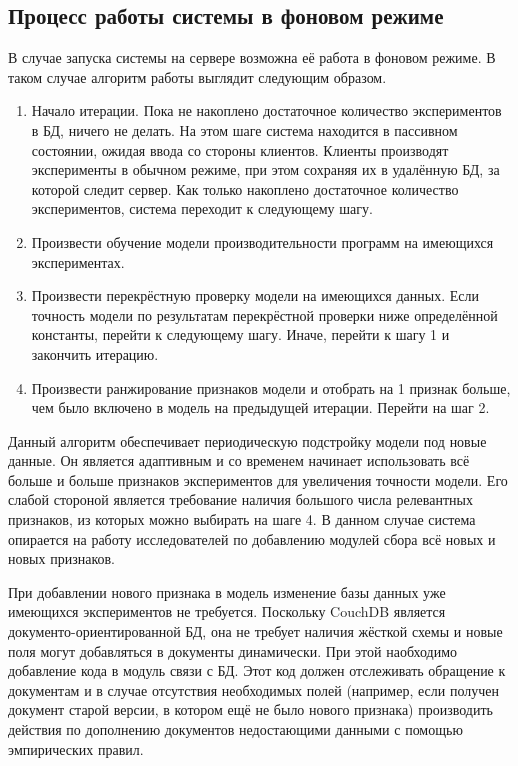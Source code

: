 \subsection{Процесс работы системы в фоновом режиме}

В случае запуска системы на сервере возможна её работа в фоновом режиме. В таком случае алгоритм работы выглядит следующим образом.

\begin{enumerate}
\item Начало итерации. Пока не накоплено достаточное количество экспериментов в БД, ничего не делать. На этом шаге система находится в пассивном состоянии, ожидая ввода со стороны клиентов. Клиенты производят эксперименты в обычном режиме, при этом сохраняя их в удалённую БД, за которой следит сервер. Как только накоплено достаточное количество экспериментов, система переходит к следующему шагу.
\item Произвести обучение модели производительности программ на имеющихся экспериментах.
\item Произвести перекрёстную проверку модели на имеющихся данных. Если точность модели по результатам перекрёстной проверки ниже определённой константы, перейти к следующему шагу. Иначе, перейти к шагу 1 и закончить итерацию.
\item Произвести ранжирование признаков модели и отобрать на 1 признак больше, чем было включено в модель на предыдущей итерации. Перейти на шаг 2.
\end{enumerate}

Данный алгоритм обеспечивает периодическую подстройку модели под новые данные. Он является адаптивным и со временем начинает использовать всё больше и больше признаков экспериментов для увеличения точности модели. Его слабой стороной является требование наличия большого числа релевантных признаков, из которых можно выбирать на шаге 4. В данном случае система опирается на работу исследователей по добавлению модулей сбора всё новых и новых признаков.

При добавлении нового признака в модель изменение базы данных уже имеющихся экспериментов не требуется. Поскольку CouchDB является документо-ориентированной БД, она не требует наличия жёсткой схемы и новые поля могут добавляться в документы динамически. При этой наобходимо добавление кода в модуль связи с БД. Этот код должен отслеживать обращение к документам и в случае отсутствия необходимых полей (например, если получен документ старой версии, в котором ещё не было нового признака) производить действия по дополнению документов недостающими данными с помощью эмпирических правил.

